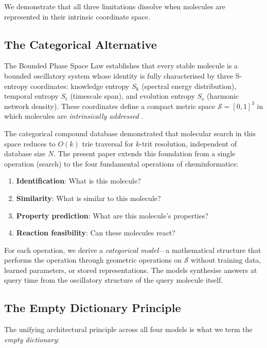 \documentclass[11pt,twocolumn,a4paper]{article}
\theoremstyle{definition}
\theoremstyle{remark}
\newcommand{\Sk}{S_{\mathrm{k}}}
\newcommand{\St}{S_{\mathrm{t}}}
\newcommand{\Se}{S_{\mathrm{e}}}
\newcommand{\Sspace}{\mathcal{S}}
\begin{document}
We demonstrate that all three limitations dissolve when molecules are represented in their intrinsic coordinate space.

\subsection{The Categorical Alternative}

The Bounded Phase Space Law \citep{sachikonye2025a} establishes that every stable molecule is a bounded oscillatory system whose identity is fully characterised by three S-entropy coordinates: knowledge entropy $\Sk$ (spectral energy distribution), temporal entropy $\St$ (timescale span), and evolution entropy $\Se$ (harmonic network density). These coordinates define a compact metric space $\Sspace = [0,1]^3$ in which molecules are \emph{intrinsically addressed} \citep{sachikonye2025c}.

The categorical compound database \citep{sachikonye2025c} demonstrated that molecular search in this space reduces to $O(k)$ trie traversal for $k$-trit resolution, independent of database size $N$. The present paper extends this foundation from a single operation (search) to the four fundamental operations of cheminformatics:

\begin{enumerate}[nosep]
\item \textbf{Identification}: What is this molecule?
\item \textbf{Similarity}: What is similar to this molecule?
\item \textbf{Property prediction}: What are this molecule's properties?
\item \textbf{Reaction feasibility}: Can these molecules react?
\end{enumerate}

For each operation, we derive a \emph{categorical model}---a mathematical structure that performs the operation through geometric operations on $\Sspace$ without training data, learned parameters, or stored representations. The models synthesise answers at query time from the oscillatory structure of the query molecule itself.

\subsection{The Empty Dictionary Principle}

The unifying architectural principle across all four models is what we term the \emph{empty dictionary}:
\end{document}

